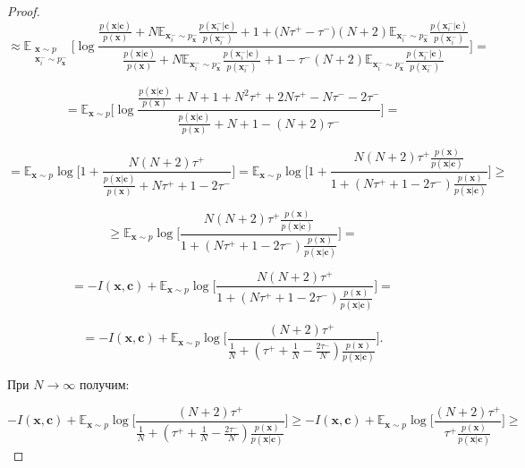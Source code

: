 \documentclass[a4paper, 14pt]{article}
\begin{document}
\begin{proof}
\[\approx \mathbb{E}_{\substack{\mathbf{x} \sim p \\ \mathbf{x}_i^- \sim p_\mathbf{x}^-}} \bigg[\log \frac{\frac{p(\mathbf{x}|\mathbf{c})}{p(\mathbf{x})} + N\mathbb{E}_{\mathbf{x}_i^- \sim p_\mathbf{x}^-}\frac{p(\mathbf{x}_i^-|\mathbf{c})}{p(\mathbf{x}_i^-)} + 1 + \big(N \tau^+ - \tau^-\big)(N + 2)\mathbb{E}_{\mathbf{x}_i^- \sim p_\mathbf{x}^-}\frac{p(\mathbf{x}_i^-|\mathbf{c})}{p(\mathbf{x}_i^-)}}{\frac{p(\mathbf{x}|\mathbf{c})}{p(\mathbf{x})} + N\mathbb{E}_{\mathbf{x}_i^- \sim p_\mathbf{x}^-}\frac{p(\mathbf{x}_i^-|\mathbf{c})}{p(\mathbf{x}_i^-)} + 1 - \tau^-(N + 2)\mathbb{E}_{\mathbf{x}_i^- \sim p_\mathbf{x}^-}\frac{p(\mathbf{x}_i^-|\mathbf{c})}{p(\mathbf{x}_i^-)}}\bigg] =\]

\[= \mathbb{E}_{\mathbf{x} \sim p}\bigg[\log \frac{\frac{p(\mathbf{x}|\mathbf{c})}{p(\mathbf{x})} + N + 1 + N^2\tau^+ + 2N\tau^+ - N\tau^- - 2\tau^-}{\frac{p(\mathbf{x}|\mathbf{c})}{p(\mathbf{x})} + N + 1 - (N + 2)\tau^-}\bigg] =\]

\[= \mathbb{E}_{\mathbf{x} \sim p}\log \bigg[1 + \frac{N(N + 2)\tau^+}{\frac{p(\mathbf{x}|\mathbf{c})}{p(\mathbf{x})} + N\tau^+ + 1 - 2\tau^-}\bigg] = \mathbb{E}_{\mathbf{x} \sim p}\log \bigg[1 + \frac{N(N + 2)\tau^+\frac{p(\mathbf{x})}{p(\mathbf{x}|\mathbf{c})}}{1 + \left(N\tau^+ + 1 - 2\tau^-\right)\frac{p(\mathbf{x})}{p(\mathbf{x}|\mathbf{c})}}\bigg] \geq\]

\[\geq \mathbb{E}_{\mathbf{x} \sim p}\log \bigg[\frac{N(N + 2)\tau^+\frac{p(\mathbf{x})}{p(\mathbf{x}|\mathbf{c})}}{1 + \left(N\tau^+ + 1 - 2\tau^-\right)\frac{p(\mathbf{x})}{p(\mathbf{x}|\mathbf{c})}}\bigg] =\]

\[= - I(\mathbf{x}, \mathbf{c}) + \mathbb{E}_{\mathbf{x} \sim p}\log \bigg[\frac{N(N + 2)\tau^+}{1 + \left(N\tau^+ + 1 - 2\tau^-\right)\frac{p(\mathbf{x})}{p(\mathbf{x}|\mathbf{c})}}\bigg] =\]

\[= - I(\mathbf{x}, \mathbf{c}) + \mathbb{E}_{\mathbf{x} \sim p}\log \bigg[\frac{(N + 2)\tau^+}{\frac{1}{N} + \left(\tau^+ + \frac{1}{N} - \frac{2\tau^-}{N}\right)\frac{p(\mathbf{x})}{p(\mathbf{x}|\mathbf{c})}}\bigg].\]

При $N \to \infty$ получим:

\[- I(\mathbf{x}, \mathbf{c}) + \mathbb{E}_{\mathbf{x} \sim p}\log \bigg[\frac{(N + 2)\tau^+}{\frac{1}{N} + \left(\tau^+ + \frac{1}{N} - \frac{2\tau^-}{N}\right)\frac{p(\mathbf{x})}{p(\mathbf{x}|\mathbf{c})}}\bigg] \geq - I(\mathbf{x}, \mathbf{c}) + \mathbb{E}_{\mathbf{x} \sim p}\log \bigg[\frac{(N + 2)\tau^+}{\tau^+\frac{p(\mathbf{x})}{p(\mathbf{x}|\mathbf{c})}}\bigg] \geq\]


\end{proof}
\end{document}
